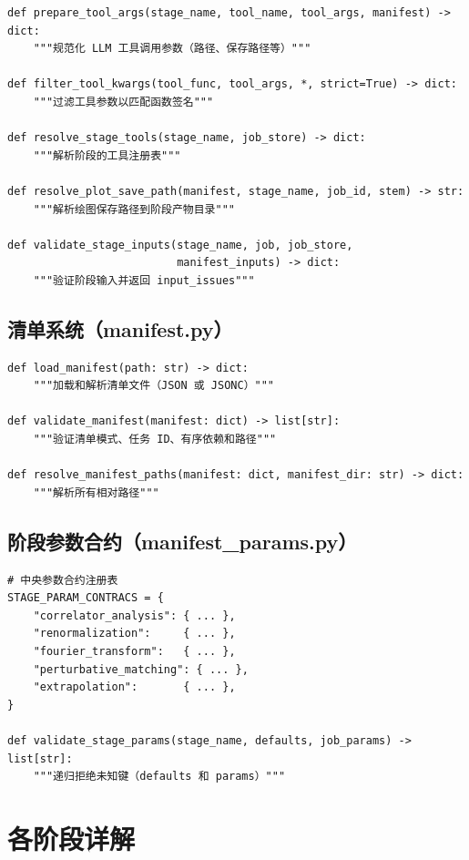 \documentclass[12pt,a4paper]{ctexart}
\begin{document}
\begin{lstlisting}[style=pycode]
def prepare_tool_args(stage_name, tool_name, tool_args, manifest) -> dict:
    """规范化 LLM 工具调用参数（路径、保存路径等）"""

def filter_tool_kwargs(tool_func, tool_args, *, strict=True) -> dict:
    """过滤工具参数以匹配函数签名"""

def resolve_stage_tools(stage_name, job_store) -> dict:
    """解析阶段的工具注册表"""

def resolve_plot_save_path(manifest, stage_name, job_id, stem) -> str:
    """解析绘图保存路径到阶段产物目录"""

def validate_stage_inputs(stage_name, job, job_store,
                          manifest_inputs) -> dict:
    """验证阶段输入并返回 input_issues"""
\end{lstlisting}

\subsection{清单系统（manifest.py）}

\begin{lstlisting}[style=pycode]
def load_manifest(path: str) -> dict:
    """加载和解析清单文件（JSON 或 JSONC）"""

def validate_manifest(manifest: dict) -> list[str]:
    """验证清单模式、任务 ID、有序依赖和路径"""

def resolve_manifest_paths(manifest: dict, manifest_dir: str) -> dict:
    """解析所有相对路径"""
\end{lstlisting}

\subsection{阶段参数合约（manifest\_params.py）}

\begin{lstlisting}[style=pycode]
# 中央参数合约注册表
STAGE_PARAM_CONTRACS = {
    "correlator_analysis": { ... },
    "renormalization":     { ... },
    "fourier_transform":   { ... },
    "perturbative_matching": { ... },
    "extrapolation":       { ... },
}

def validate_stage_params(stage_name, defaults, job_params) -> list[str]:
    """递归拒绝未知键（defaults 和 params）"""
\end{lstlisting}

\section{各阶段详解}
\end{document}
